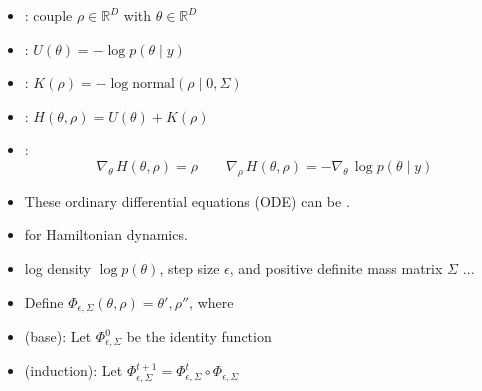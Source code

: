 \documentclass[10pt]{report}
\begin{document}
\begin{itemize}
\item {}: couple  $\rho \in
  \mathbb{R}^D$ with  $\theta \in \mathbb{R}^D$
\item {}: $U(\theta) = -\log p(\theta \mid y)$
\item {}: $K(\rho) = -\log \textrm{normal}(\rho
  \mid 0, \Sigma)$
\item {}: $H(\theta, \rho) = U(\theta) + K(\rho)$
\item {}:
  $$
  \nabla_\theta \, H(\theta, \rho) = \rho
  \qquad
  \nabla_\rho \, H(\theta, \rho) = -\nabla_{\theta} \, \log
  p(\theta \mid y)
  $$
\item These ordinary differential equations (ODE) can be .
\end{itemize}

\begin{itemize}
\item {} for Hamiltonian dynamics.
\item {} log density $\log p(\theta)$, step size
  $\epsilon$, and positive definite mass matrix $\Sigma$ $\ldots$
\item Define  $\Phi_{\epsilon, \Sigma}(\theta, \rho) = \theta', \rho''$, where
\item {} (base): Let $\Phi^0_{\epsilon, \Sigma}$ be the identity function
\item {} (induction): Let $\Phi^{t +
    1}_{\epsilon, \Sigma} = \Phi^t_{\epsilon,\Sigma} \circ
  \Phi_{\epsilon,\Sigma}$
\end{itemize}
\end{document}
